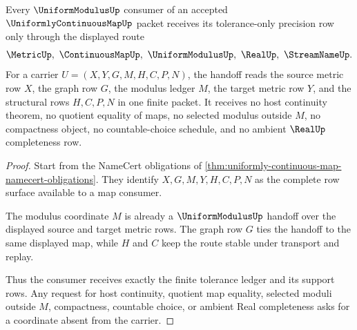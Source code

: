 \begin{theorem}
\label{thm:uniformly-continuous-map-modulus-handoff}
Every $\UniformModulusUp$ consumer of an accepted $\UniformlyContinuousMapUp$ packet receives its tolerance-only precision row only through the displayed route
$$
\MetricUp,\ \ContinuousMapUp,\ \UniformModulusUp,\ \RealUp,\ \StreamNameUp .
$$
For a carrier $U=(X,Y,G,M,H,C,P,N)$, the handoff reads the source metric row $X$, the graph row $G$, the modulus ledger $M$, the target metric row $Y$, and the structural rows $H,C,P,N$ in one finite packet. It receives no host continuity theorem, no quotient equality of maps, no selected modulus outside $M$, no compactness object, no countable-choice schedule, and no ambient $\RealUp$ completeness row.
\end{theorem}
\begin{proof}
Start from the NameCert obligations of \autoref{thm:uniformly-continuous-map-namecert-obligations}. They identify $X,G,M,Y,H,C,P,N$ as the complete row surface available to a map consumer.

The modulus coordinate $M$ is already a $\UniformModulusUp$ handoff over the displayed source and target metric rows. The graph row $G$ ties the handoff to the same displayed map, while $H$ and $C$ keep the route stable under transport and replay.

Thus the consumer receives exactly the finite tolerance ledger and its support rows. Any request for host continuity, quotient map equality, selected moduli outside $M$, compactness, countable choice, or ambient Real completeness asks for a coordinate absent from the carrier.
\end{proof}




